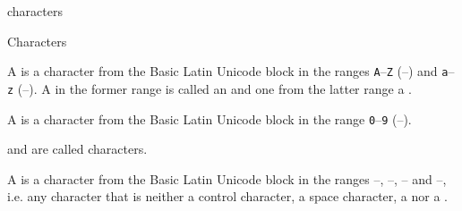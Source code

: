 \documentclass{stex}
\begin{document}
\begin{smodule}{characters}


\ifinputref\else{}\fi

\begin{sfragment}[id=sec:characters]{Characters}
  \begin{sparagraph}[style=symdoc,for={letter,uppercase,lowercase}]
    A  is a character from the Basic Latin Unicode block
    in the ranges \texttt{A}--\texttt{Z} (--) and
    \texttt{a}--\texttt{z} (--).
    A  in the former range is called an 
     and one from the latter range a 
    .
  \end{sparagraph}

  \begin{sparagraph}[style=symdoc,for=digit]
    A  is a character from the Basic Latin Unicode block
    in the range \texttt{0}--\texttt{9} (--).
  \end{sparagraph}

  \begin{sparagraph}[style=symdoc,for=alphanumeric]
     and  are called  characters.
  \end{sparagraph}
  
  \begin{sparagraph}[style=symdoc,for=symbol]
    A  is a character from the Basic Latin Unicode block
    in the ranges
    --,
    --,
    -- and
    --,
    i.e. any character that is neither a control character, a space character,
    a  nor a .
  \end{sparagraph}
\end{sfragment}

\ifinputref\else{}\fi

\end{smodule}
\end{document}
